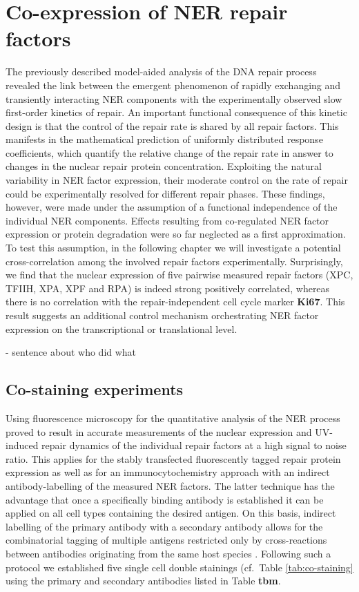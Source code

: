 \chapter{Co-expression of NER repair factors}
The previously described model-aided analysis of the DNA repair process revealed the link between the emergent phenomenon of rapidly exchanging and transiently interacting NER components with the experimentally observed slow first-order kinetics of repair. An important functional consequence of this kinetic design is that the control of the repair rate is shared by all repair factors. This manifests in the mathematical prediction of uniformly distributed response coefficients, which quantify the relative change of the repair rate in answer to changes in the nuclear repair protein concentration. Exploiting the natural variability in NER factor expression, their moderate control on the rate of repair could be experimentally resolved for different repair phases. These findings, however, were made under the assumption of a functional independence of the individual NER components. Effects resulting from co-regulated NER factor expression or protein degradation were so far neglected as a first approximation.  \\
To test this assumption, in the following chapter we will investigate a potential cross-correlation among the involved repair factors experimentally. Surprisingly, we find that the nuclear expression of five pairwise measured repair factors (XPC, TFIIH, XPA, XPF and RPA) is indeed strong positively correlated, whereas there is no correlation with the repair-independent cell cycle marker \textbf{Ki67}. This result suggests an additional control mechanism orchestrating NER factor expression on the transcriptional or translational level.    

- sentence about who did what

\section{Co-staining experiments}

Using fluorescence microscopy for the quantitative analysis of the NER process proved to result in accurate measurements of the nuclear expression and UV-induced repair dynamics of the individual repair factors at a high signal to noise ratio. This applies for the stably transfected fluorescently tagged repair protein expression as well as for an immunocytochemistry approach with an indirect antibody-labelling of the measured NER factors. The latter technique has the advantage that once a specifically binding antibody is established it can be applied on all cell types containing the desired antigen. On this basis, indirect labelling of the primary antibody with a secondary antibody allows for the combinatorial tagging of multiple antigens restricted only by cross-reactions between antibodies originating from the same host species \cite{Burry2011,Giepmans2006}. Following such a protocol we established five single cell double stainings (cf.\ Table \ref{tab:co-staining} using the primary and secondary antibodies listed in Table \textbf{tbm}. 


